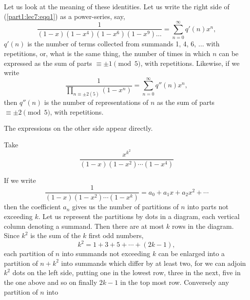 Let us look at the meaning of these identities. Let us write the right
side of (\ref{part1:lec7:eqq1}) as a power-series, say, 
$$
  \frac{1}{(1-x)(1-x^4)(1-x^6)(1-x^9)\ldots}= \sum^\infty_{n=0} q'(n) x^n,
$$
$q'(n)$ is the number of terms collected from summands 1, 4, 6,
  $\ldots$ with repetitions, or, what is the same thing, the number of
  times in which $n$ can be expressed as the sum of parts $\equiv \pm
  1 \pmod{5}$, with repetitions. Likewise, if we write
$$
  \frac{1}{\prod\limits_{n \equiv \pm 2(5)}(1-x^n)} = \sum^\infty_{n=0}
  q''(n) x^n,
$$
then $q''(n)$ is the number of representations of $n$ as the sum of
parts $\equiv \pm 2 \pmod{5}$, with repetitions.

The expressions on the other side appear directly.

Take\pageoriginale 
$$
\frac{x^{k^2}}{(1-x)(1-x^2)\cdots (1-x^4)}
$$

If we write
$$
\frac{1}{(1-x)(1-x^2)\cdots (1-x^k)}= a_0 + a_1 x + a_2x^2+ \cdots
$$
then the coefficient $a_n$ gives us the number of partitions of $n$
into parts not exceeding $k$. Let us represent the partitions by dots
in a diagram, each vertical column denoting a summand. Then there are
at most $k$ rows in the diagram. Since $k^2$ is the sum of the $k$
first odd numbers,
$$
k^2 =1+ 3+5+ \cdots + (2k-1),
$$
each partition of $n$ into summands not exceeding $k$ can be enlarged
into a partition of $n+k^2$ into summands which differ by at least
two, for we can adjoin $k^2$ dots on the left side, putting one in the
lowest row, three in the next, five in the one above and so on finally
$2k-1$ in the top most row. Conversely any partition of $n$ into 

